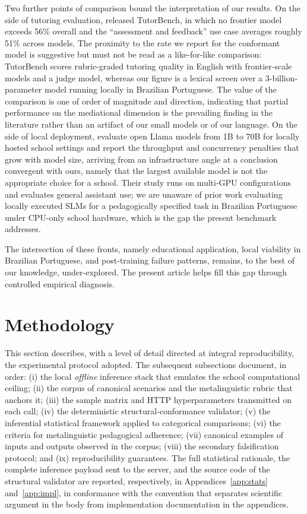 \documentclass{sbc2023}%
\begin{document}
Two further points of comparison bound the interpretation of our results. On the side of tutoring evaluation, \citet{srinivasa2025tutorbench} released TutorBench, in which no frontier model exceeds 56\% overall and the ``assessment and feedback'' use case averages roughly 51\% across models. The proximity to the rate we report for the conformant model is suggestive but must not be read as a like-for-like comparison: TutorBench scores rubric-graded tutoring quality in English with frontier-scale models and a judge model, whereas our figure is a lexical screen over a 3-billion-parameter model running locally in Brazilian Portuguese. The value of the comparison is one of order of magnitude and direction, indicating that partial performance on the mediational dimension is the prevailing finding in the literature rather than an artifact of our small models or of our language. On the side of local deployment, \citet{chan2026bigger} evaluate open Llama models from 1B to 70B for locally hosted school settings and report the throughput and concurrency penalties that grow with model size, arriving from an infrastructure angle at a conclusion convergent with ours, namely that the largest available model is not the appropriate choice for a school. Their study runs on multi-GPU configurations and evaluates general assistant use; we are unaware of prior work evaluating locally executed SLMs for a pedagogically specified task in Brazilian Portuguese under CPU-only school hardware, which is the gap the present benchmark addresses.

The intersection of these fronts, namely educational application, local viability in Brazilian Portuguese, and post-training failure patterns, remains, to the best of our knowledge, under-explored. The present article helps fill this gap through controlled empirical diagnosis.

\section{Methodology}
\label{sec:method}

This section describes, with a level of detail directed at integral reproducibility, the experimental protocol adopted. The subsequent subsections document, in order: (i) the local \textit{offline} inference stack that emulates the school computational ceiling; (ii) the corpus of canonical scenarios and the metalinguistic rubric that anchors it; (iii) the sample matrix and HTTP hyperparameters transmitted on each call; (iv) the deterministic structural-conformance validator; (v) the inferential statistical framework applied to categorical comparisons; (vi) the criteria for metalinguistic pedagogical adherence; (vii) canonical examples of inputs and outputs observed in the corpus; (viii) the secondary falsification protocol; and (ix) reproducibility guarantees. The full statistical rationale, the complete inference payload sent to the server, and the source code of the structural validator are reported, respectively, in Appendices~\ref{app:stats} and~\ref{app:impl}, in conformance with the convention that separates scientific argument in the body from implementation documentation in the appendices.
\end{document}
